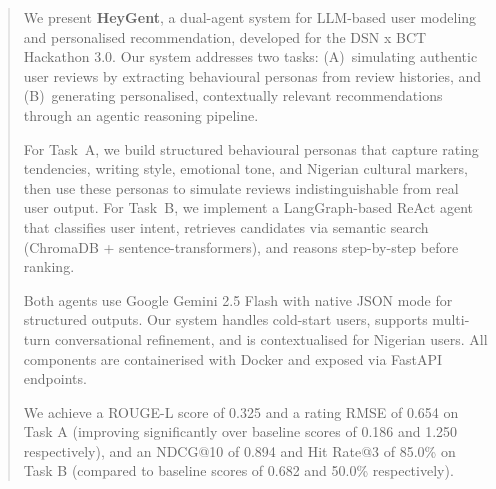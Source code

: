 \documentclass[11pt, a4paper]{article}
\begin{document}

\newpage
\setcounter{page}{1}

\begin{abstract}
\noindent
We present \textbf{HeyGent}, a dual-agent system for LLM-based user modeling and personalised recommendation, developed for the DSN x BCT Hackathon 3.0. Our system addresses two tasks: (A)~simulating authentic user reviews by extracting behavioural personas from review histories, and (B)~generating personalised, contextually relevant recommendations through an agentic reasoning pipeline.

For Task~A, we build structured behavioural personas that capture rating tendencies, writing style, emotional tone, and Nigerian cultural markers, then use these personas to simulate reviews indistinguishable from real user output. For Task~B, we implement a LangGraph-based ReAct agent that classifies user intent, retrieves candidates via semantic search (ChromaDB + sentence-transformers), and reasons step-by-step before ranking.

Both agents use Google Gemini 2.5 Flash with native JSON mode for structured outputs. Our system handles cold-start users, supports multi-turn conversational refinement, and is contextualised for Nigerian users. All components are containerised with Docker and exposed via FastAPI endpoints.

We achieve a ROUGE-L score of 0.325 and a rating RMSE of 0.654 on Task A (improving significantly over baseline scores of 0.186 and 1.250 respectively), and an NDCG@10 of 0.894 and Hit Rate@3 of 85.0\% on Task B (compared to baseline scores of 0.682 and 50.0\% respectively).
\end{abstract}
\end{document}

